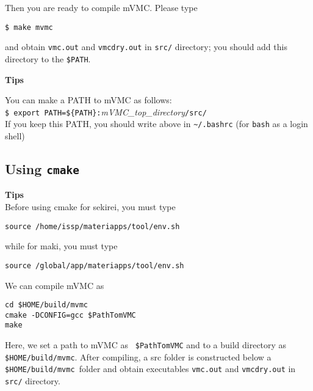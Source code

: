 Then you are ready to compile mVMC.
Please type
\begin{verbatim}
$ make mvmc
\end{verbatim}
and obtain \verb|vmc.out| and \verb|vmcdry.out| in \verb|src/| directory;
you should add this directory to the \verb|$PATH|.

\begin{screen}
\Large 
{\bf Tips}
\normalsize

You can make a PATH to mVMC as follows:
\\
\verb|$ export PATH=${PATH}:|\textit{mVMC\_top\_directory}\verb|/src/|
\\
If you keep this PATH, you should write above in \verb|~/.bashrc|
(for \verb|bash| as a login shell)

\end{screen}


\subsection{Using \texttt{cmake}}

\begin{screen}
\Large 
{\bf Tips}
\normalsize\\
Before using cmake for sekirei, you must type 
\begin{verbatim}
source /home/issp/materiapps/tool/env.sh
\end{verbatim}
while for maki, you must type
\begin{verbatim}
source /global/app/materiapps/tool/env.sh
\end{verbatim}
\end{screen}

We can compile mVMC as
\begin{verbatim}
cd $HOME/build/mvmc
cmake -DCONFIG=gcc $PathTomVMC
make
\end{verbatim}
Here, we set a path to mVMC as \verb| $PathTomVMC| and to a build directory as \verb| $HOME/build/mvmc|. 
After compiling, a src folder is constructed below a \verb| $HOME/build/mvmc |folder 
and obtain executables \verb|vmc.out| and \verb|vmcdry.out| in \verb|src/| directory. 

